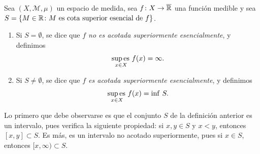 \documentclass[a4paper, 11pt, oneside]{report}
\begin{document}
\begin{definition}
  Sea $(X,\mathcal{M},\mu)$ un espacio de medida, sea $f \colon X \to \overline{\mathbb R}$ una función medible y sea $S = \{M \in \mathbb R \colon M \textup{ es cota superior esencial de } f\}$.
  \begin{enumerate}
    \item Si $S = \emptyset$, se dice que \emph{$f$ no es acotada superiormente esencialmente}, y definimos
    \[\operatorname*{sup\,es\,}_{x \in X} f(x) = \infty.\]
    \item Si $S \neq \emptyset$, se dice que \emph{$f$ es acotada superiormente esencialmente}, y definimos
    \[\operatorname*{sup\,es\,}_{x \in X} f(x) = \inf\, S.\]
  \end{enumerate}
\end{definition}

Lo primero que debe observarse es que el conjunto $S$ de la definición anterior es un intervalo, pues verifica la siguiente propiedad: si $x,y \in S$ y $x<y$, entonces $[x,y] \subset S$. Es más, es un intervalo no acotado superiormente, pues si $x \in S$, entonces $[x,\infty) \subset S$.
\end{document}
